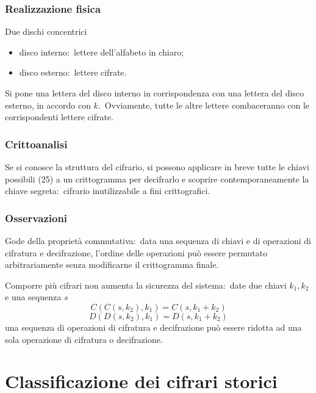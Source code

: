 \subsubsection{Realizzazione fisica}

Due dischi concentrici

\begin{itemize}
    \item disco interno:\ lettere dell'alfabeto in chiaro;
    \item disco esterno:\ lettere cifrate.\
\end{itemize}

\noindent Si pone una lettera del disco interno in corrispondenza con una lettera del disco esterno, in accordo con $k$.\
Ovviamente, tutte le altre lettere combaceranno con le corrispondenti lettere cifrate.

\subsubsection{Crittoanalisi}

Se si conosce la struttura del cifrario, si possono applicare in breve tutte le chiavi possibili (25) a un crittogramma per decifrarlo e scoprire contemporaneamente la chiave segreta:\ cifrario inutilizzabile a fini crittografici.\

\subsubsection{Osservazioni}

Gode della proprietà commutativa:\ data una sequenza di chiavi e di operazioni di cifratura e decifrazione, l'ordine delle operazioni può essere permutato arbitrariamente senza modificarne il crittogramma finale.\

Comporre più cifrari non aumenta la sicurezza del sistema:\ date due chiavi $k_1, k_2$ e una sequenza $s$
\[C(C(s,k_2), k_1) = C (s, k_1 + k_2)\]
\[D(D(s,k_2), k_1) = D (s, k_1 + k_2)\]
una sequenza di operazioni di cifratura e decifrazione può essere ridotta ad una sola operazione di cifratura o decifrazione.\

\section{Classificazione dei cifrari storici}

